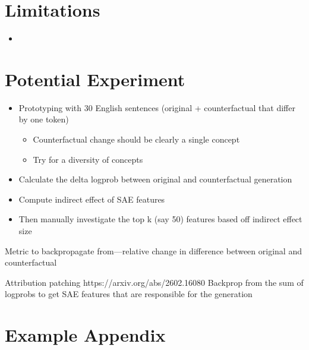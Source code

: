 \documentclass[11pt]{article}
\begin{document}
\section{Limitations}
\begin{itemize}
    \item 
\end{itemize}

\section{Potential Experiment}
\begin{itemize}
    \item Prototyping with 30 English sentences (original + counterfactual that differ by one token)
    \begin{itemize}
        \item Counterfactual change should be clearly a single concept
        \item Try for a diversity of concepts
    \end{itemize}
    \item Calculate the delta logprob between original and counterfactual generation
    \item Compute indirect effect of SAE features
    \item Then manually investigate the top k (say 50) features based off indirect effect size
\end{itemize}



Metric to backpropagate from—relative change in difference between original and counterfactual

Attribution patching https://arxiv.org/abs/2602.16080
Backprop from the sum of logprobs to get SAE features that are responsible for the generation

%



\appendix

\section{Example Appendix}
\label{sec:appendix}
\end{document}
